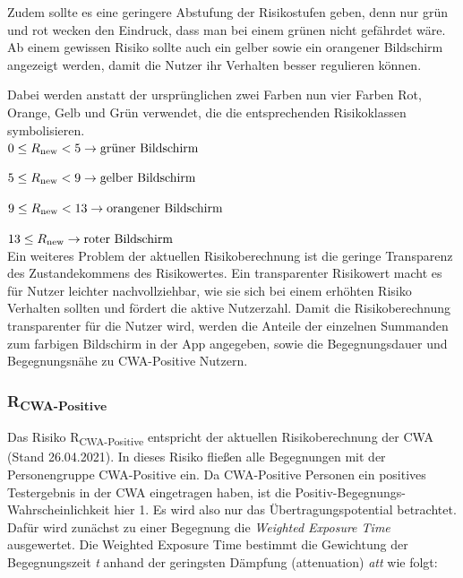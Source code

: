 \documentclass[conference,compsoc]{IEEEtran}
\begin{document}
Zudem sollte es eine geringere Abstufung der Risikostufen geben, denn nur grün und rot wecken den Eindruck, dass man bei einem grünen nicht gefährdet wäre. 
Ab einem gewissen Risiko sollte auch ein gelber sowie ein orangener Bildschirm angezeigt werden, damit die Nutzer ihr Verhalten besser regulieren können.

Dabei werden anstatt der ursprünglichen zwei Farben nun vier Farben Rot, Orange, Gelb und Grün verwendet, die die entsprechenden Risikoklassen symbolisieren.
\\

$0\le R\textsubscript{new} < 5 \rightarrow \text{grüner Bildschirm}$

$5\le R\textsubscript{new} < 9 \rightarrow \text{gelber Bildschirm}$

$9\le R\textsubscript{new} < 13 \rightarrow \text{orangener Bildschirm}$

$13 \le R\textsubscript{new}  \rightarrow \text{roter Bildschirm}$
\\

Ein weiteres Problem der aktuellen Risikoberechnung ist die geringe Transparenz des Zustandekommens des Risikowertes.
Ein transparenter Risikowert macht es für Nutzer leichter nachvollziehbar, wie sie sich bei einem erhöhten Risiko Verhalten sollten und fördert die aktive Nutzerzahl.
Damit die Risikoberechnung transparenter für die Nutzer wird, werden die Anteile der einzelnen Summanden zum farbigen Bildschirm in der App angegeben, 
sowie die Begegnungsdauer und Begegnungsnähe zu CWA-Positive Nutzern.\\

\subsubsection{R\textsubscript{CWA-Positive}}\label{CWAPositive}

Das Risiko R\textsubscript{CWA-Positive} entspricht der aktuellen Risikoberechnung der CWA (Stand 26.04.2021). 
In dieses Risiko fließen alle Begegnungen mit der Personengruppe CWA-Positive ein. 
Da CWA-Positive Personen ein positives Testergebnis in der CWA eingetragen haben, ist die Positiv-Begegnungs-Wahrscheinlichkeit hier 1. 
Es wird also nur das Übertragungspotential betrachtet. Dafür wird zunächst zu einer Begegnung die \textit{Weighted Exposure Time} ausgewertet. 
Die Weighted Exposure Time bestimmt die Gewichtung der Begegnungszeit \textit{t} anhand der geringsten Dämpfung (attenuation) \textit{att}  wie folgt: 
\end{document}
